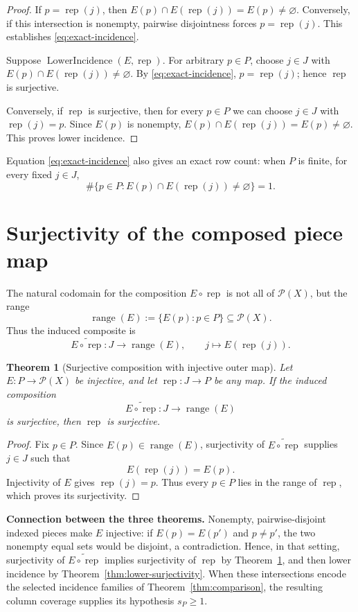 \documentclass[11pt, letterpaper]{nyjm}
\newtheorem{theorem}{Theorem}[section]
\newcommand{\range}{\operatorname{range}}
\newcommand{\rep}{\operatorname{rep}}
\newcommand{\LowerIncidence}{\operatorname{LowerIncidence}}
\begin{document}
	\begin{proof}
		If $p=\rep(j)$, then
		$E(p)\cap E(\rep(j))=E(p)\ne\varnothing$.
		Conversely, if this intersection is nonempty, pairwise disjointness
		forces $p=\rep(j)$. This establishes \eqref{eq:exact-incidence}.
		
		Suppose $\LowerIncidence(E,\rep)$. For arbitrary $p\in P$,
		choose $j\in J$ with
		$E(p)\cap E(\rep(j))\ne\varnothing$. By
		\eqref{eq:exact-incidence}, $p=\rep(j)$; hence $\rep$ is surjective.
		
		Conversely, if $\rep$ is surjective, then for every $p\in P$ we can
		choose $j\in J$ with $\rep(j)=p$. Since $E(p)$ is nonempty,
		$E(p)\cap E(\rep(j))=E(p)\ne\varnothing$. This proves lower incidence.
	\end{proof}
	
	\noindent
	Equation \eqref{eq:exact-incidence} also gives an exact row count:
	when $P$ is finite, for every fixed $j\in J$,
	\[
	\#\{p\in P:E(p)\cap E(\rep(j))\ne\varnothing\}=1.
	\]
	
	
	\section{Surjectivity of the composed piece map}
	
	The natural codomain for the composition $E\circ\rep$ is not all of
	$\mathcal P(X)$, but the range
	\[
	\range(E):=\{E(p):p\in P\}\subseteq\mathcal P(X).
	\]
	Thus the induced composite is
	\[
	\widetilde{E\circ\rep}:J\longrightarrow\range(E),
	\qquad j\longmapsto E(\rep(j)).
	\]
	
	\begin{theorem}[Surjective composition with injective outer
		map]\label{thm:composite}
		Let $E:P\to\mathcal P(X)$ be injective, and let
		$\rep:J\to P$ be any map. If the induced composition
		\[
		\widetilde{E\circ\rep}:J\longrightarrow\range(E)
		\]
		is surjective, then $\rep$ is surjective.
	\end{theorem}
	
	\begin{proof}
		Fix $p\in P$. Since $E(p)\in\range(E)$, surjectivity of
		$\widetilde{E\circ\rep}$ supplies $j\in J$ such that
		\[
		E(\rep(j))=E(p).
		\]
		Injectivity of $E$ gives $\rep(j)=p$. Thus every $p\in P$ lies in
		the range of $\rep$, which proves its surjectivity.
	\end{proof}
	
	\noindent
	\textbf{Connection between the three theorems.}
	Nonempty, pairwise-disjoint indexed pieces make $E$ injective: if
	$E(p)=E(p')$ and $p\ne p'$, the two nonempty equal sets would be
	disjoint, a contradiction. Hence, in that setting, surjectivity of
	$\widetilde{E\circ\rep}$ implies surjectivity of $\rep$ by
	Theorem~\ref{thm:composite}, and then lower incidence by
	Theorem~\ref{thm:lower-surjectivity}. When these intersections encode the
	selected incidence families of Theorem~\ref{thm:comparison}, the
	resulting column coverage supplies its hypothesis $s_P\geq1$.
	
\end{document}
